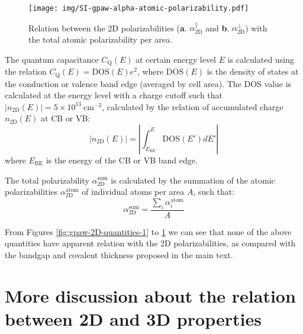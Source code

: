 \documentclass[manuscript=suppinfo,email=true,hyperref=true,keywords=false]{achemso}
\begin{document}
\begin{figure}[htbp]
  \centering
  \texttt{[image: img/SI-gpaw-alpha-atomic-polarizability.pdf]}
  \caption{Relation between the 2D polarizabilities
    (\textbf{a}. $\alpha_{\mathrm{2D}}^{\parallel}$ and
    \textbf{b}. $\alpha_{\mathrm{2D}}^{\perp}$) with the total atomic polarizability per area.}
  \label{fig:gpaw-2D-quantities-3}
\end{figure}

The quantum capacitance
$C_{\mathrm{Q}}(E)$ at certain energy level $E$ is calculated using
the relation $C_{\mathrm{Q}}(E)=\mathrm{DOS}(E)e^{2}$, where
$\mathrm{DOS}(E)$ is the density of states at the conduction or valence band edge (averaged by cell
area). The DOS value is calculated at the energy level with a charge
cutoff such that
$|n_{\mathrm{2D}}(E)| = 5 \times 10^{13}\ \mathrm{cm}^{-2}$, calculated by
the relation of accumulated charge $n_{\mathrm{2D}}(E)$ at CB or VB:
\begin{equation}
  \label{eq:CQ-method}
  |n_{\mathrm{2D}}(E)| = \left|\int_{E_{\mathrm{BE}}}^{E} \mathrm{DOS}(E') dE' \right|
\end{equation}
where $E_{\mathrm{BE}}$ is the energy of the CB or VB band edge.

The total polarizability $\alpha_{\mathrm{2D}}^{\mathrm{sum}}$ is calculated by the
summation of the atomic polarizabilities $\alpha_{\mathrm{2D}}^{\mathrm{atom}}$
\cite{Gould_2016_jctc} of individual atoms per area $A$, such that:
\begin{equation}
  \label{eq:atom-polar}
  \alpha_{\mathrm{2D}}^{\mathrm{sum}} = \frac{\sum_{i} \alpha^{\mathrm{atom}}_{i}}{A}
\end{equation}

From Figures \ref{fig:gpaw-2D-quantities-1} to
\ref{fig:gpaw-2D-quantities-3} we can see that none of the above
quantities have apparent relation with the 2D polarizabilities, as
compared with the bandgap and covalent thickness proposed in the main
text. 

\section{More discussion about the relation between 2D and 3D properties}
\label{sec:2D-3D}
\end{document}
